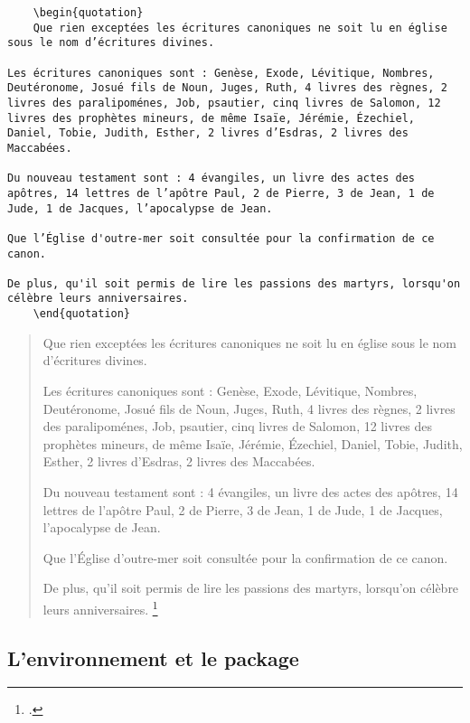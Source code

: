 \begin{verbatim}
	\begin{quotation}
	Que rien exceptées les écritures canoniques ne soit lu en église sous le nom d’écritures divines.

Les écritures canoniques sont : Genèse, Exode, Lévitique, Nombres, Deutéronome, Josué fils de Noun, Juges, Ruth, 4 livres des règnes, 2 livres des paralipoménes, Job, psautier, cinq livres de Salomon, 12 livres des prophètes mineurs, de même Isaïe, Jérémie, Ézechiel, Daniel, Tobie, Judith, Esther, 2 livres d’Esdras, 2 livres des Maccabées.

Du nouveau testament sont : 4 évangiles, un livre des actes des apôtres, 14 lettres de l’apôtre Paul, 2 de Pierre, 3 de Jean, 1 de Jude, 1 de Jacques, l’apocalypse de Jean.

Que l’Église d'outre-mer soit consultée pour la confirmation de ce canon.

De plus, qu'il soit permis de lire les passions des martyrs, lorsqu'on célèbre leurs anniversaires.
	\end{quotation}
\end{verbatim}

	\begin{quotation}
Que rien exceptées les écritures canoniques ne soit lu en église sous le nom d’écritures divines.

Les écritures canoniques sont : Genèse, Exode, Lévitique, Nombres, Deutéronome, Josué fils de Noun, Juges, Ruth, 4 livres des règnes, 2 livres des paralipoménes, Job, psautier, cinq livres de Salomon, 12 livres des prophètes mineurs, de même Isaïe, Jérémie, Ézechiel, Daniel, Tobie, Judith, Esther, 2 livres d’Esdras, 2 livres des Maccabées.

Du nouveau testament sont : 4 évangiles, un livre des actes des apôtres, 14 lettres de l’apôtre Paul, 2 de Pierre, 3 de Jean, 1 de Jude, 1 de Jacques, l’apocalypse de Jean.

Que l’Église d'outre-mer soit consultée pour la confirmation de ce canon.

De plus, qu'il soit permis de lire les passions des martyrs, lorsqu'on célèbre leurs anniversaires.
\footcite{BreveHippone}
	\end{quotation}

\subsection{L'environnement  et le package }


